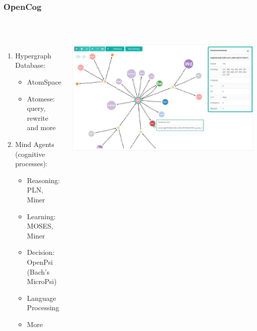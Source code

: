 \documentclass[aspectratio=169]{beamer}
\begin{document}
\begin{frame}




  \frametitle{OpenCog}

  \\[0.5cm]

  \begin{columns}
    \column{3in}
  
    \begin{enumerate}
    \item Hypergraph Database: 
      \begin{itemize}
      \item AtomSpace
      \item Atomese: query, rewrite and more
      \end{itemize}
    \item Mind Agents (cognitive processes):
      \begin{itemize}
      \item \alert{Reasoning: PLN, Miner}
      \item Learning: MOSES, Miner
      \item Decision: OpenPsi (Bach's MicroPsi)
      \item Language Processing
      \item More
      \end{itemize}
    \end{enumerate}

    \column{3in}

    \includegraphics[scale=0.2]{pics/ng2-atomspace-visualizer.jpg}


\end{columns}
\end{frame}
\end{document}
